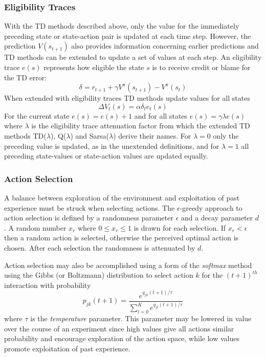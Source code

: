 \subsubsection{Eligibility Traces}
\label{sec:eligibility}
With the TD methods described above, only the value for the immediately
preceding state or state-action pair is updated at each time step.  However, the
prediction $V(s_{t+1})$ also provides information concerning earlier predictions
and TD methods can be extended to update a set of values at each step.  An
eligibility trace $e(s)$ \cite{tanner:2005} represents how eligible the state
$s$ is to receive credit or blame for the TD error:
\begin{equation}
\delta = r_{t+1} + \gamma V^\pi(s_{t+1}) - V^\pi(s_t)
\end{equation}
When extended with eligibility traces TD methods update values for all states
\begin{equation}
\Delta V_t(s) = \alpha \delta_t e_t(s)
\end{equation}
For the current state $e(s) = e(s) + 1$ and for all states
$e(s) = \gamma \lambda e(s)$ where $\lambda$ is the eligibility trace
attenuation factor from which the extended TD methods TD($\lambda$),
Q($\lambda$) and Sarsa($\lambda$) derive their names. For $\lambda = 0$ only
the preceding value is updated, as in the unextended definitions,
and for $\lambda = 1$ all preceding state-values or state-action values are
updated equally.

\subsubsection{Action Selection}
\label{sec:actionselection}
A balance between exploration of the environment and exploitation of past
experience must be struck when selecting actions.  The $\epsilon$-greedy
approach to action selection is defined by a randomness parameter $\epsilon$ and
a decay parameter $d$ \cite{rivest:1990}.  A random number $x_r$ where $0 \leq
x_r \leq 1$ is drawn for each selection.  If $x_r < \epsilon$ then a random
action is selected, otherwise the perceived optimal action is chosen. After each
selection the randomness is attenuated by $d$.

Action selection may also be accomplished using a form of the \textit{softmax}
method \cite[\S2]{suttonbarto:1998} using the Gibbs (or
Boltzmann) distribution to select action $k$ for the $(t+1)^{th}$ interaction with probability
\begin{equation}
p_{jk}(t+1) = \frac{e^{q_{jk}(t+1)/\tau}}{\sum_{l=0}^K e^{q_{jl}(t+1)/\tau}}
\end{equation}
where $\tau$ is the \textit{temperature} parameter.  This parameter may be
lowered in value over the course of an experiment since high values give all
actions similar probability and encourage exploration of the action space,
while low values promote exploitation of past experience.

